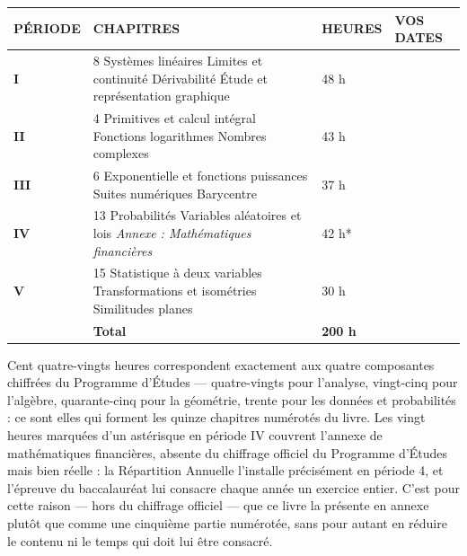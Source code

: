 \vspace{0.6em}
\begin{center}
\setlength{\tabcolsep}{6pt}
\renewcommand{\arraystretch}{1.5}
\begin{tabular}{@{}L{1.3cm} L{6.5cm} L{1.6cm} L{2.5cm}@{}}
\toprule
\textsf{\footnotesize\bfseries PÉRIODE} &
\textsf{\footnotesize\bfseries CHAPITRES} &
\textsf{\footnotesize\bfseries HEURES} &
\textsf{\footnotesize\bfseries VOS DATES} \\
\midrule
\textsf{\bfseries I}   & 8 Systèmes linéaires  Limites et continuité  Dérivabilité  Étude et représentation graphique & 48 h & \\
\textsf{\bfseries II}  & 4 Primitives et calcul intégral  Fonctions logarithmes  Nombres complexes & 43 h & \\
\textsf{\bfseries III} & 6 Exponentielle et fonctions puissances  Suites numériques  Barycentre & 37 h & \\
\textsf{\bfseries IV}  & 13 Probabilités  Variables aléatoires et lois \newline \textit{Annexe : Mathématiques financières} & 42 h* & \\
\textsf{\bfseries V}   & 15 Statistique à deux variables  Transformations et isométries  Similitudes planes & 30 h & \\
\midrule
& \textsf{\bfseries Total} & \textsf{\bfseries 200 h} & \\
\bottomrule
\end{tabular}
\end{center}

\vspace{0.4em}
\noindent Cent quatre-vingts heures correspondent exactement aux quatre
composantes chiffrées du Programme d'Études — quatre-vingts pour l'analyse,
vingt-cinq pour l'algèbre, quarante-cinq pour la géométrie, trente pour les
données et probabilités : ce sont elles qui forment les quinze chapitres
numérotés du livre. Les vingt heures marquées d'un astérisque en période IV
couvrent l'annexe de mathématiques financières, absente du chiffrage
officiel du Programme d'Études mais bien réelle : la Répartition Annuelle
l'installe précisément en période 4, et l'épreuve du baccalauréat lui
consacre chaque année un exercice entier. C'est pour cette raison — hors du
chiffrage officiel — que ce livre la présente en annexe plutôt que comme une
cinquième partie numérotée, sans pour autant en réduire le contenu ni le
temps qui doit lui être consacré.

